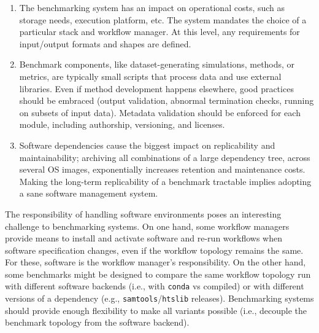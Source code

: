 \documentclass[11pt]{article}
\begin{document}
\begin{enumerate}
\item The benchmarking system has an impact on operational costs, such as storage needs, execution platform, etc.  The system mandates the choice of a particular stack and workflow manager. At this level, any requirements for input/output formats and shapes are defined.

\item Benchmark components, like dataset-generating simulations, methods, or metrics, are typically small scripts that process data and use external libraries. Even if method development happens elsewhere, good practices should be embraced (output validation, abnormal termination checks, running on subsets of input data).  Metadata validation should be enforced for each module, including authorship, versioning, and licenses.

\item Software dependencies cause the biggest impact on replicability and maintainability; archiving all combinations of a large dependency tree, across several OS images, exponentially increases retention and maintenance costs. Making the long-term replicability of a benchmark tractable implies adopting a sane software management system.

\end{enumerate}

The responsibility of handling software environments poses an interesting challenge to benchmarking systems. On one hand, some workflow managers provide means to install and activate software and re-run workflows when software specification changes, even if the workflow topology remains the same. For these, software is the workflow manager's responsibility. On the other hand, some benchmarks might be designed to compare the same workflow topology run with different software backends (i.e., with \texttt{conda} vs compiled) or with different versions of a dependency (e.g., \texttt{samtools}/\texttt{htslib} releases). Benchmarking systems should provide enough flexibility to make all variants possible (i.e., decouple the benchmark topology from the software backend).
\end{document}
